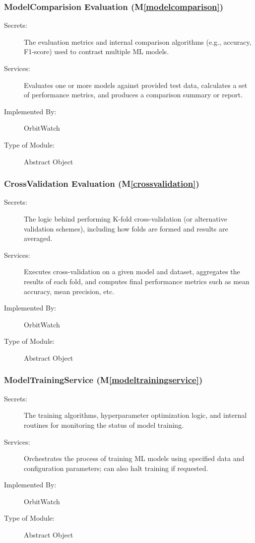 \documentclass[12pt, titlepage]{article}
\newcommand{\mref}[1]{M\ref{#1}}
\begin{document}
\subsubsection{ModelComparision Evaluation (\mref{modelcomparison})}
\begin{description}
  \item[Secrets:] 
    The evaluation metrics and internal comparison algorithms (e.g., accuracy, F1-score)
    used to contrast multiple ML models.
  \item[Services:] 
    Evaluates one or more models against provided test data, calculates a set of
    performance metrics, and produces a comparison summary or report.
  \item[Implemented By:] 
    OrbitWatch
  \item[Type of Module:] 
    Abstract Object
\end{description}

\subsubsection{CrossValidation Evaluation (\mref{crossvalidation})}
\begin{description}
  \item[Secrets:] 
    The logic behind performing K-fold cross-validation (or alternative validation
    schemes), including how folds are formed and results are averaged.
  \item[Services:] 
    Executes cross-validation on a given model and dataset, aggregates the results
    of each fold, and computes final performance metrics such as mean accuracy,
    mean precision, etc.
  \item[Implemented By:] 
    OrbitWatch
  \item[Type of Module:] 
    Abstract Object
\end{description}

\subsubsection{ModelTrainingService (\mref{modeltrainingservice})}
\begin{description}
  \item[Secrets:] 
    The training algorithms, hyperparameter optimization logic, and internal 
    routines for monitoring the status of model training.
  \item[Services:] 
    Orchestrates the process of training ML models using specified data and 
    configuration parameters; can also halt training if requested.
  \item[Implemented By:] 
    OrbitWatch
  \item[Type of Module:] 
    Abstract Object
\end{description}
\end{document}
